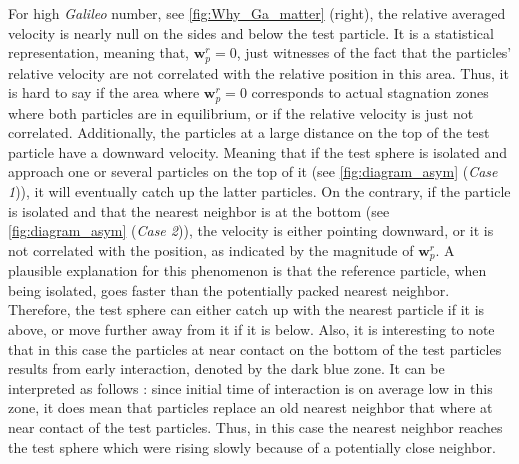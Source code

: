 

For high \textit{Galileo} number, see \ref{fig:Why_Ga_matter} (right), the relative averaged velocity is nearly null on the sides and below the test particle. 
It is a statistical representation, meaning that, $\textbf{w}_p^r = 0$, just witnesses of the fact that the particles' relative velocity are not correlated with the relative position in this area. 
Thus, it is hard to say if the area where $\textbf{w}_p^r = 0$ corresponds to actual stagnation zones where both particles are in equilibrium, or if the relative velocity is just not correlated. 
Additionally, the particles at a large distance on the top of the test particle have a downward velocity. 
Meaning that if the test sphere is isolated and approach one or several  particles on the top of it (see \ref{fig:diagram_asym} (\textit{Case 1})), it will eventually catch up the latter particles. 
On the contrary, if the particle is isolated and that the nearest neighbor is at the bottom (see \ref{fig:diagram_asym} (\textit{Case 2})), the velocity is either pointing downward, or it is not correlated with the position, as indicated by the magnitude of $\textbf{w}_p^r$. 
A plausible explanation for this phenomenon is that the reference particle, when being isolated, goes faster than the potentially packed nearest neighbor.
Therefore, the test sphere can either catch up with the nearest particle if it is above, or move further away from it if it is below.
Also, it is interesting to note that in this case the particles at near contact on the bottom of the test particles results from early interaction, denoted by the dark blue zone. 
It can be interpreted as follows : since 
initial time of interaction is on average low in this zone, it does mean that particles replace an old nearest neighbor that where at near contact of the test particles. 
Thus, in this case the nearest neighbor reaches the test sphere which were rising slowly because of a potentially close neighbor. 

